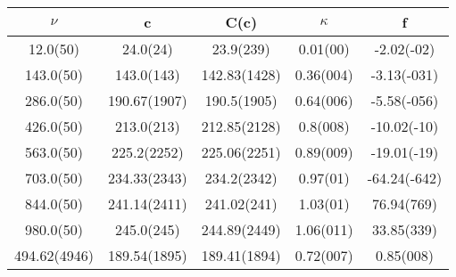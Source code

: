 \begin{table}[H]
	\centering
	\begin{tabular}{ccccc}
		$\nu$ & c & C(c) & $\kappa$ & f\\
		\hline
		12.0(50) & 24.0(24) & 23.9(239) & 0.01(00) & -2.02(-02)	\\
		143.0(50) & 143.0(143) & 142.83(1428) & 0.36(004) & -3.13(-031)	\\
		286.0(50) & 190.67(1907) & 190.5(1905) & 0.64(006) & -5.58(-056)	\\
		426.0(50) & 213.0(213) & 212.85(2128) & 0.8(008) & -10.02(-10)	\\
		563.0(50) & 225.2(2252) & 225.06(2251) & 0.89(009) & -19.01(-19)	\\
		703.0(50) & 234.33(2343) & 234.2(2342) & 0.97(01) & -64.24(-642)	\\
		844.0(50) & 241.14(2411) & 241.02(241) & 1.03(01) & 76.94(769)	\\
		980.0(50) & 245.0(245) & 244.89(2449) & 1.06(011) & 33.85(339)	\\
		494.62(4946) & 189.54(1895) & 189.41(1894) & 0.72(007) & 0.85(008)	\\
	\end{tabular}
\end{table}